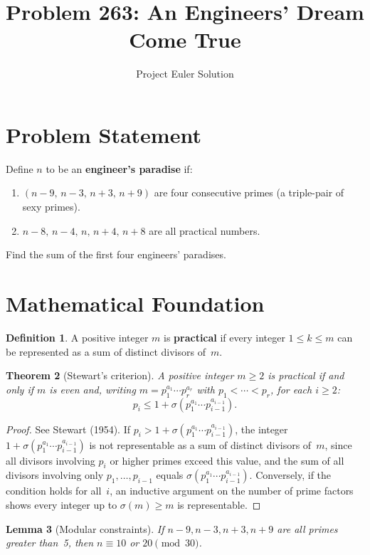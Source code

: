 \documentclass[12pt]{article}
\title{Problem 263: An Engineers' Dream Come True}
\author{Project Euler Solution}
\date{}
\newtheorem{theorem}{Theorem}
\newtheorem{lemma}[theorem]{Lemma}
\theoremstyle{definition}
\newtheorem{definition}[theorem]{Definition}
\begin{document}
\maketitle

\section{Problem Statement}

Define $n$ to be an \textbf{engineer's paradise} if:
\begin{enumerate}
\item $(n{-}9,\, n{-}3,\, n{+}3,\, n{+}9)$ are four consecutive primes (a triple-pair of sexy primes).
\item $n{-}8,\, n{-}4,\, n,\, n{+}4,\, n{+}8$ are all practical numbers.
\end{enumerate}
Find the sum of the first four engineers' paradises.

\section{Mathematical Foundation}

\begin{definition}
A positive integer $m$ is \textbf{practical} if every integer $1 \le k \le m$ can be represented as a sum of distinct divisors of~$m$.
\end{definition}

\begin{theorem}[Stewart's criterion]
A positive integer $m \ge 2$ is practical if and only if $m$ is even and, writing $m = p_1^{a_1}\cdots p_r^{a_r}$ with $p_1 < \cdots < p_r$, for each $i \ge 2$:
\[
p_i \le 1 + \sigma(p_1^{a_1}\cdots p_{i-1}^{a_{i-1}}).
\]
\end{theorem}

\begin{proof}
See Stewart (1954). If $p_i > 1 + \sigma(p_1^{a_1}\cdots p_{i-1}^{a_{i-1}})$, the integer $1 + \sigma(p_1^{a_1}\cdots p_{i-1}^{a_{i-1}})$ is not representable as a sum of distinct divisors of~$m$, since all divisors involving $p_i$ or higher primes exceed this value, and the sum of all divisors involving only $p_1,\ldots,p_{i-1}$ equals $\sigma(p_1^{a_1}\cdots p_{i-1}^{a_{i-1}})$. Conversely, if the condition holds for all~$i$, an inductive argument on the number of prime factors shows every integer up to $\sigma(m) \ge m$ is representable.
\end{proof}

\begin{lemma}[Modular constraints]
If $n-9, n-3, n+3, n+9$ are all primes greater than~5, then $n \equiv 10$ or $20\pmod{30}$.
\end{lemma}
\end{document}
